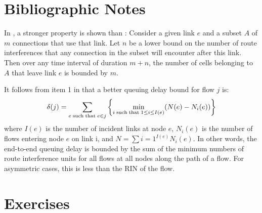 \section{Bibliographic Notes}


In \cite{leb99}, a stronger property is shown than
: Consider a given link $e$ and a subset $A$
of $m$ connections that use that link. Let $n$ be a lower bound on
the number of route interferences that any connection in the
subset will encounter after this link. Then over any time interval
of duration $m+n$, the number of cells belonging to $A$ that leave
link $e$ is bounded by $m$.

It follows from item 1 in  that a better
queuing delay bound for flow $j$ is:
$$\delta(j) = \sum_{e \mathrm{\; such \; that \; } e \in j}
 \left\{\min_{i \mathrm{\; such \; that \; } 1 \leq i\leq I(e)}(N(e)-N_i(e)) \right\}$$
 where $I(e)$ is the number of incident links at node $e$,
 $N_i(e)$ is the number of flows entering node $e$ on link i, and
 $N=\sum{i=1}^{I(e)}N_i(e)$.
In other words, the end-to-end queuing delay is bounded by the sum
of the minimum numbers of route interference units for all flows
at all nodes along the path of a flow. For asymmetric cases, this
is less than the RIN of the flow.

\section{Exercises}




